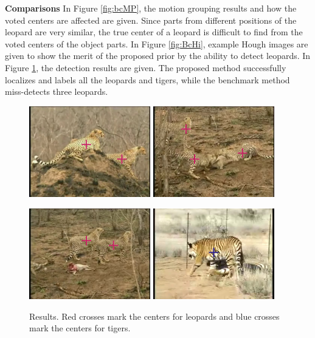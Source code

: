 \textbf{Comparisons} In Figure \ref{fig:bcMP}, the motion grouping results and how the voted centers are affected are given. Since parts from different positions of the leopard are very similar, the true center of a leopard is difficult to find from the voted centers of the object parts. In Figure \ref{fig:BcHi}, example Hough images are given to show the merit of the proposed prior by the ability to detect leopards. In Figure \ref{fig:bgdr}, the detection results are given. The proposed method successfully localizes and labels all the leopards and tigers, while the benchmark method miss-detects three leopards.

\begin{figure}
\centering
\includegraphics[width=0.47\textwidth,bb=0 0 640 480]{leo1.jpg}
\includegraphics[width=0.47\textwidth,bb=0 0 640 480]{leo2.jpg}

\includegraphics[width=0.47\textwidth,bb=0 0 640 480]{leo3.jpg}
\includegraphics[width=0.47\textwidth,bb=0 0 640 480]{ti1.jpg}

\caption[Detection results]{Results. Red crosses mark the centers for leopards and blue crosses mark the centers for tigers.}
\label{fig:bgdr}
\end{figure}
